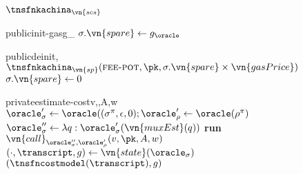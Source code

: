 \begin{transitionfn}{$\tnsfnkachina_{\vn{scs}}$}
  \vsep
  \mkpub
  \begin{receivequery}{public}{init-gas}{g_\oracle}
    \State \Let $\sigma.\vn{spare} \gets g_\oracle$
  \end{receivequery}
  \begin{receivequery}{public}{deinit}{\pk, }
    \State \Run $\tnsfnkachina_{\vn{sp}}(\textsc{fee-pot}, \pk, \sigma.\vn{spare} \times \vn{gasPrice})$
    \State \Let $\sigma.\vn{spare} \gets 0$
  \end{receivequery}
  \mknorm
  \vsep
  \mkpriv
  \begin{receivequery}{private}{estimate-cost}{v,\allowbreak \pk,\allowbreak A,\allowbreak w}
    \State \Let $\oracle_\sigma' \gets \oracle((\sigma^\pi, \epsilon, 0); \oracle_\rho' \gets \oracle(\rho^\pi)$
    \State \Let $\oracle_\sigma'' \gets \lambda q: \oracle_\sigma'(\vn{muxEst}(q))$
    \State \textbf{run} $\vn{call}_{\oracle_\sigma'', \oracle_\rho'}(v,
      \pk, A, w)$
    \State \Let $(\cdot, \transcript, g) \gets \vn{state}(\oracle_\sigma)$
    \State \Return $(\tnsfncostmodel(\transcript), g)$
  \end{receivequery}
  \mknorm


\end{transitionfn}
